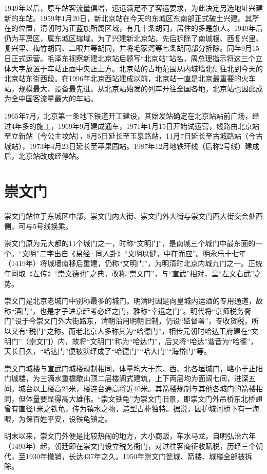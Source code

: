 1949年以后，原车站客流量俱增，远远满足不了客运要求，为此决定另选地址兴建新的车站。1959年1月20日，新北京站在今天的东城区东南部正式破土兴建。其所在的位置，清朝时为正蓝旗所属区域，有几十条胡同，居住的多是旗人。1949年后仍为平房区，属东城区辖域。为了兴建新北京站，先后拆除了南城根、西复兴里、复兴里、梅竹胡同、二眼井等胡同，并将毛家湾等七条胡同部分拆除。同年9月15日正式运营。毛泽东视察新建北京站后题写“北京站”站名，周总理指示将这三个立体大字放置于车站正面中央正上方。北京站的占地范围从内城墙北侧往北到今天的北京站东街西段。在1996年北京西站建成以前，北京站一直是北京最重要的火车站，规模最大、设备最先进。从北京站始发的列车开往全国各地，北京站也因此成为全中国客流量最大的车站。

1965年7月，北京第一条地下铁道开工建设，其始发站确定在北京站站前广场，经过4年多的施工，1969年9月建成通车，1971年1月15日开始试运营，线路由北京站至立新站（今公主坟站），8月5日延长至玉泉路站，11月7日延长至古城路站（今古城站），1973年4月23日延长至苹果园站。1987年12月地铁环线（后称2号线）建成后，北京站改成经停站。

\section{崇文门}
崇文门站位于东城区中部，崇文门内大街、崇文门外大街与崇文门西大街交会处西侧，可与5号线换乘。

崇文门原为元大都的11个城门之一，时称“文明门”，是南城三个城门中最东面的一个。“文明”二字出自《易经·同人卦》“文明以健，中在而应”。明永乐十七年（1419年）将城墙南移后重建，仍称“文明门”，为明清时北京内城九门之一。正统年间取《左传》“崇文德也”之典，改称“崇文门”，与“宣武”相对，呈“左文右武”之势。

崇文门是北京老城门中别称最多的城门。明清时因是向皇城内运酒的专用通道，故称“酒门”，也是才子进京赶考必经之门，雅称“幸运之门”。明代将“京师税务衙门”设于今崇文门外大街路东，清朝沿用明朝旧制，仍设“监督署”，专收货税，所以又有“税门”之称。而老北京人多称其为“哈德门”，相传元朝时哈达王府建在“文明门”（崇文门）内，故将“文明门”称为“哈达门”，后又将“哈达”谐音为“哈德”，天长日久，“哈达门”便被演绎成了“哈德门”“哈大门”“海岱门”等。

崇文门城楼与宣武门城楼规制相同，体量均大于东、西、北各垣城门，略小于正阳门城楼，为三滴水重檐歇山顶二层楼阁式建筑，上下两层均为面阔七间，进深五间。城台以上楼高25米，楼连台通高将近40米。其箭楼规制与其他各城门的箭楼相同，但体量要显得高大雄伟。“崇文铁龟”为崇文门旧景，即崇文门外吊桥东北桥翅曾有直径1米之铁龟，传为镇水之物，造型古朴独特。据说，因护城河桥下有一海眼，为保百姓平安，设铁龟镇之。

明末以来，崇文门外便是比较热闹的地方，大小商贩，车水马龙。自明弘治六年（1493年）起，朝廷即在崇文门设立税务衙门，对过往客商征收赋税，历经三个朝代，至1930年撤销，长达437年之久。1950年崇文门瓮城、箭楼、城楼全部被拆除。


